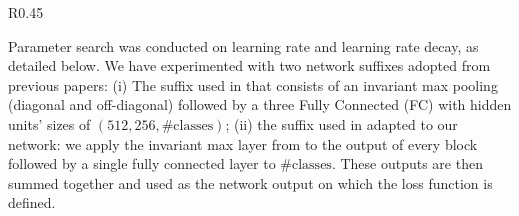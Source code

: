 \documentclass{article}
\begin{document}
\begin{wraptable}[13]{R}{0.45\textwidth} \vspace*{-5pt}
\caption{Regression, the QM9 dataset.}\label{tab:regression}
  \centering
  \label{tab:reg_res}\end{wraptable}
Parameter search was conducted on learning rate and learning rate decay, as detailed below.  
We have experimented with two network suffixes adopted from previous papers: (i) The suffix used in \cite{maron2018invariant} that consists of an invariant max pooling (diagonal and off-diagonal) followed by a three Fully Connected (FC) with hidden units' sizes of $(512,256, \# \text{classes})$;  (ii) the suffix used in \cite{xu2018how} adapted to our network: we apply the invariant max layer from \cite{maron2018invariant} to the output of every block followed by a single fully connected layer to $\# \text{classes}$. These outputs are then summed together and used as the network output on which the loss function is defined.
\end{document}
